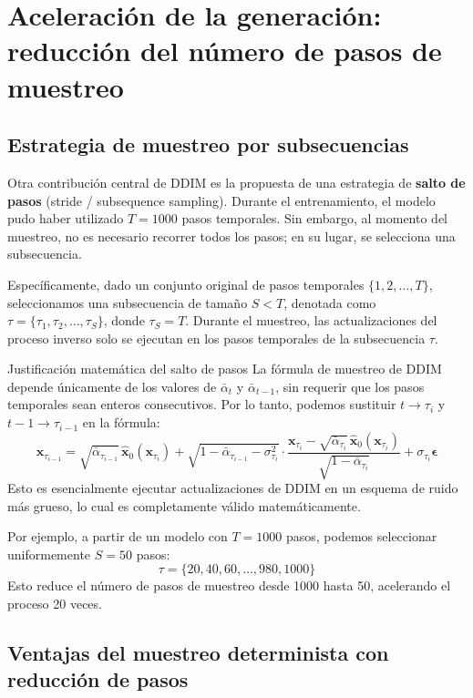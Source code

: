 \section{Aceleración de la generación: reducción del número de pasos de muestreo}

\subsection{Estrategia de muestreo por subsecuencias}

Otra contribución central de DDIM es la propuesta de una estrategia de \textbf{salto de pasos} (stride / subsequence sampling). Durante el entrenamiento, el modelo pudo haber utilizado $T=1000$ pasos temporales. Sin embargo, al momento del muestreo, no es necesario recorrer todos los pasos; en su lugar, se selecciona una subsecuencia.

Específicamente, dado un conjunto original de pasos temporales $\{1, 2, \ldots, T\}$, seleccionamos una subsecuencia de tamaño $S < T$, denotada como $\tau = \{\tau_1, \tau_2, \ldots, \tau_S\}$, donde $\tau_S = T$. Durante el muestreo, las actualizaciones del proceso inverso solo se ejecutan en los pasos temporales de la subsecuencia $\tau$.

\begin{importantbox}{Justificación matemática del salto de pasos}
La fórmula de muestreo de DDIM depende únicamente de los valores de $\bar{\alpha}_t$ y $\bar{\alpha}_{t-1}$, sin requerir que los pasos temporales sean enteros consecutivos. Por lo tanto, podemos sustituir $t \to \tau_i$ y $t-1 \to \tau_{i-1}$ en la fórmula:
$$
\mathbf{x}_{\tau_{i-1}} = \sqrt{\bar{\alpha}_{\tau_{i-1}}}\,\hat{\mathbf{x}}_0(\mathbf{x}_{\tau_i}) + \sqrt{1-\bar{\alpha}_{\tau_{i-1}}-\sigma_{\tau_i}^2}\cdot\frac{\mathbf{x}_{\tau_i} - \sqrt{\bar{\alpha}_{\tau_i}}\,\hat{\mathbf{x}}_0(\mathbf{x}_{\tau_i})}{\sqrt{1-\bar{\alpha}_{\tau_i}}} + \sigma_{\tau_i}\boldsymbol{\epsilon}
$$
Esto es esencialmente ejecutar actualizaciones de DDIM en un esquema de ruido más grueso, lo cual es completamente válido matemáticamente.
\end{importantbox}

Por ejemplo, a partir de un modelo con $T=1000$ pasos, podemos seleccionar uniformemente $S=50$ pasos:
$$
\tau = \{20, 40, 60, \ldots, 980, 1000\}
$$
Esto reduce el número de pasos de muestreo desde 1000 hasta 50, acelerando el proceso 20 veces.

\subsection{Ventajas del muestreo determinista con reducción de pasos}

